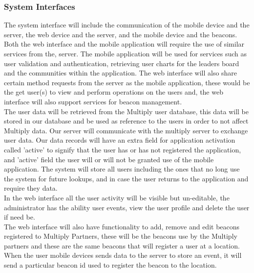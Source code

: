 \documentclass[11pt]{article}
\begin{document}
\subsubsection{System Interfaces}
The  system interface will include the communication of the mobile device and the server, the web device and the server, and the mobile device and the beacons. 
Both the web interface and the  mobile application will require the use of similar services from the, server. The mobile application will be used for services such as user validation and authentication, retrieving user charts for the leaders board and the communities within the application. The web interface will also share certain  method requests from the server as the mobile application, these would be the get user(s) to view and perform operations on the users and, the web interface will also support services for beacon management. \\
The user data will be retrieved from the Multiply user database, this data will be stored in our database and be used as reference to the users in order to not affect Multiply data. Our server will communicate with the multiply server to exchange user data. Our data records will have an extra field for application activation called 'active' to signify that the user has or has not registered the application, and 'active' field the user will or will not be granted use of the mobile application. The system will store all users including the ones that no long use the system for future lookups, and in case the user returns to the application and require they data. \\
In the web interface all the user activity will be visible but un-editable, the administrator has the ability user events, view the user profile and delete the user if need be. \\
The web interface will also have functionality to add, remove and edit beacons registered to Multiply Partners, these will be the beacons use by the Multiply partners and these are the same beacons that will register a user at a location. When the user mobile devices sends data to the server to store an event, it will send a particular beacon id used to register the beacon to the location.\\ 
\end{document}

